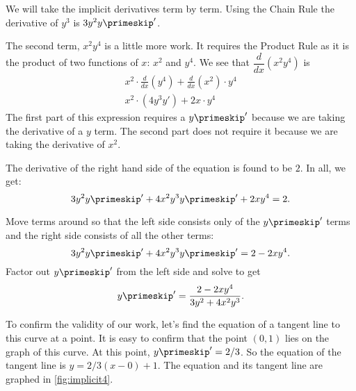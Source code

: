 {We will take the implicit derivatives term by term. Using the Chain Rule the derivative of $y^3$ is $3y^2 y\primeskip'$.

The second term, $x^2y^4$ is a little more work. It requires the Product Rule as it is the product of two functions of $x$: $x^2$ and $y^4$. We see that $\dfrac{d}{dx}(x^2y^4)$ is
\begin{gather*}
x^2 \cdot \frac{d}{dx}(y^4) + \frac{d}{dx}(x^2) \cdot y^4 \\
x^2 \cdot (4y^3y') + 2x \cdot y^4 
\end{gather*}
The first part of this expression requires a $y\primeskip'$ because we are taking the derivative of a $y$ term. The second part does not require it because we are taking the derivative of $x^2$.

The derivative of the right hand side of the equation is found to be $2$. In all, we get:
\[3y^2y\primeskip' + 4x^2y^3y\primeskip' + 2xy^4 = 2.\]

Move terms around so that the left side consists only of the $y\primeskip'$ terms and the right side consists of all the other terms:
\[3y^2y\primeskip' + 4x^2y^3y\primeskip' = 2-2xy^4.\]
Factor out $y\primeskip'$ from the left side and solve to get
\[y\primeskip' = \frac{2-2xy^4}{3y^2+4x^2y^3}.\]

To confirm the validity of our work, let's find the equation of a tangent line to this curve at a point. It is easy to confirm that the point $(0,1)$ lies on the graph of this curve. At this point, $y\primeskip' = 2/3$. So the equation of the tangent line is $y = 2/3(x-0)+1$. The equation and its tangent line are graphed in \autoref{fig:implicit4}.

}
